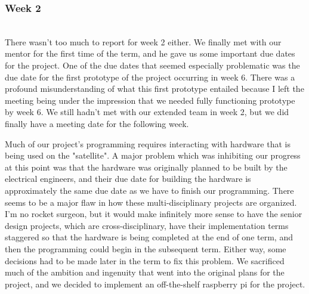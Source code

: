 \documentclass[10pt,letterpaper,onecolumn,draftclsnofoot,journal]{IEEEtran}
\begin{document}
\subsubsection{Week 2}\hspace*{\fill}\\
There wasn't too much to report for week 2 either. We finally met with our mentor for the first time of the term, and he gave us some important due dates for the project. One of the due dates that seemed especially problematic was the due date for the first prototype of the project occurring in week 6. There was a profound misunderstanding of what this first prototype entailed because I left the meeting being under the impression that we needed fully functioning prototype by week 6. We still hadn't met with our extended team in week 2, but we did finally have a meeting date for the following week.\vspace{.3cm}
\par
Much of our project's programming requires interacting with hardware that is being used on the "satellite". A major problem which was inhibiting our progress at this point was that the hardware was originally planned to be built by the electrical engineers, and their due date for building the hardware is approximately the same due date as we have to finish our programming. There seems to be a major flaw in how these multi-disciplinary projects are organized. I'm no rocket surgeon, but it would make infinitely more sense to have the senior design projects, which are cross-disciplinary, have their implementation terms staggered so that the hardware is being completed at the end of one term, and then the programming could begin in the subsequent term. Either way, some decisions had to be made later in the term to fix this problem. We sacrificed much of the ambition and ingenuity that went into the original plans for the project, and we decided to implement an off-the-shelf raspberry pi for the project.\vspace{.3cm}
\par
\end{document}
